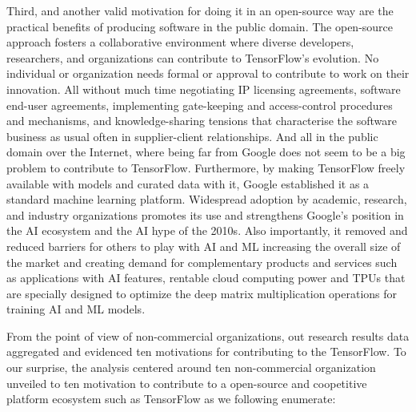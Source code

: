 \documentclass[CHICAGO,Times1COL]{WileyNJDv5} %
\begin{document}
Third, and another valid motivation for doing it in an open-source way are the practical benefits of producing software in the public domain. The open-source approach fosters a collaborative environment where diverse developers, researchers, and organizations can contribute to TensorFlow's evolution. No individual or organization needs formal or approval to contribute to work on their innovation.  All without much time negotiating IP licensing agreements, software end-user agreements,  implementing gate-keeping and access-control procedures and mechanisms, and knowledge-sharing tensions that characterise the software business as usual often in supplier-client relationships. And all in the public domain over the Internet, where being far from Google does not seem to be a big problem to contribute to TensorFlow. 
Furthermore, by making TensorFlow freely available with models and curated data with it, Google established it as a standard machine learning platform. Widespread adoption by academic, research, and industry organizations promotes its use and strengthens Google's position in the AI ecosystem and the AI hype of the 2010s. Also importantly,  it removed and reduced barriers for others to play with \ac{AI} and \ac{ML} increasing the overall size of the market and creating demand for complementary products and services such as applications with \ac{AI} features, 
rentable cloud computing power and TPUs that are specially designed to optimize the deep matrix multiplication operations for training \ac{AI} and \ac{ML} models. 


From the point of view of non-commercial organizations, out research results data aggregated and evidenced ten motivations for contributing to the TensorFlow. To our surprise, the analysis centered around ten non-commercial organization unveiled to ten motivation to contribute to a open-source and coopetitive platform ecosystem such as TensorFlow as we following enumerate: 
\end{document}
